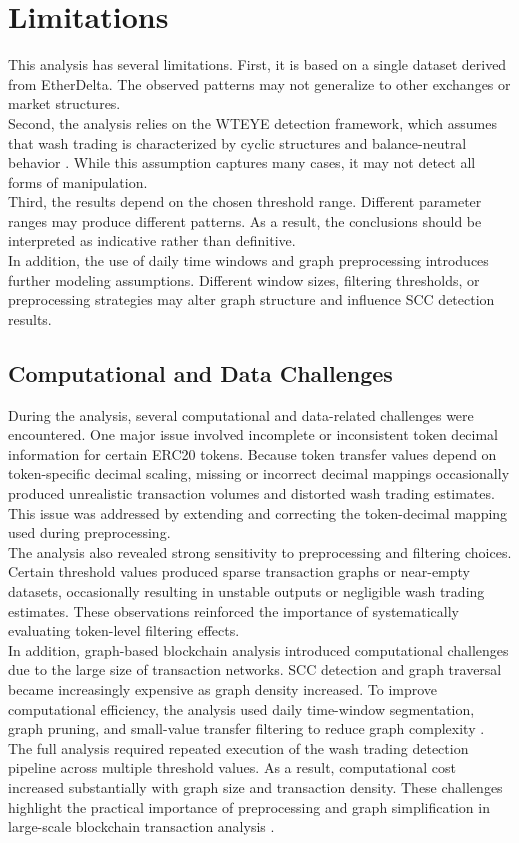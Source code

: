 \documentclass[language=english,thesis=bachelor,nosecondtitle,faculty=cb,onesided,13pt]{hsmw-thesis}
\begin{document}
\section{Limitations}
This analysis has several limitations. First, it is based on a single dataset derived from EtherDelta. The observed patterns may not generalize to other exchanges or market structures.\\
Second, the analysis relies on the WTEYE detection framework, which assumes that wash trading is characterized by cyclic structures and balance-neutral behavior \cite{cui2023chain}. While this assumption captures many cases, it may not detect all forms of manipulation.\\
Third, the results depend on the chosen threshold range. Different parameter ranges may produce different patterns. As a result, the conclusions should be interpreted as indicative rather than definitive.\\
In addition, the use of daily time windows and graph preprocessing introduces further modeling assumptions. Different window sizes, filtering thresholds, or preprocessing strategies may alter graph structure and influence SCC detection results.

	\subsection{Computational and Data Challenges}
During the analysis, several computational and data-related challenges were encountered. One major issue involved incomplete or inconsistent token decimal information for certain ERC20 tokens. Because token transfer values depend on token-specific decimal scaling, missing or incorrect decimal mappings occasionally produced unrealistic transaction volumes and distorted wash trading estimates. This issue was addressed by extending and correcting the token-decimal mapping used during preprocessing.\\
The analysis also revealed strong sensitivity to preprocessing and filtering choices. Certain threshold values produced sparse transaction graphs or near-empty datasets, occasionally resulting in unstable outputs or negligible wash trading estimates. These observations reinforced the importance of systematically evaluating token-level filtering effects.\\
In addition, graph-based blockchain analysis introduced computational challenges due to the large size of transaction networks. SCC detection and graph traversal became increasingly expensive as graph density increased. To improve computational efficiency, the analysis used daily time-window segmentation, graph pruning, and small-value transfer filtering to reduce graph complexity \cite{chen2020traveling, sedgewick2011algorithms}.\\
The full analysis required repeated execution of the wash trading detection pipeline across multiple threshold values. As a result, computational cost increased substantially with graph size and transaction density. These challenges highlight the practical importance of preprocessing and graph simplification in large-scale blockchain transaction analysis \cite{chen2020traveling, cui2023chain, sedgewick2011algorithms}.
\end{document}
